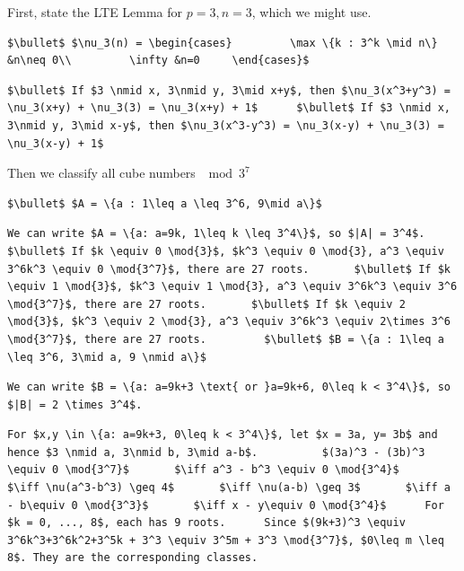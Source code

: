 \begin{enumerate}
First, state the LTE Lemma for $p = 3, n = 3$, which we might use.

 


 \begin{verbatim}
$\bullet$ $\nu_3(n) = \begin{cases}         \max \{k : 3^k \mid n\} &n\neq 0\\         \infty &n=0     \end{cases}$
\end{verbatim}

\begin{verbatim}
$\bullet$ If $3 \nmid x, 3\nmid y, 3\mid x+y$, then $\nu_3(x^3+y^3) = \nu_3(x+y) + \nu_3(3) = \nu_3(x+y) + 1$      $\bullet$ If $3 \nmid x, 3\nmid y, 3\mid x-y$, then $\nu_3(x^3-y^3) = \nu_3(x-y) + \nu_3(3) = \nu_3(x-y) + 1$   
\end{verbatim}

Then we classify all cube numbers $\mod{3^7}$
\begin{verbatim}
$\bullet$ $A = \{a : 1\leq a \leq 3^6, 9\mid a\}$
\end{verbatim}

\begin{verbatim}
We can write $A = \{a: a=9k, 1\leq k \leq 3^4\}$, so $|A| = 3^4$.          $\bullet$ If $k \equiv 0 \mod{3}$, $k^3 \equiv 0 \mod{3}, a^3 \equiv 3^6k^3 \equiv 0 \mod{3^7}$, there are 27 roots.       $\bullet$ If $k \equiv 1 \mod{3}$, $k^3 \equiv 1 \mod{3}, a^3 \equiv 3^6k^3 \equiv 3^6 \mod{3^7}$, there are 27 roots.       $\bullet$ If $k \equiv 2 \mod{3}$, $k^3 \equiv 2 \mod{3}, a^3 \equiv 3^6k^3 \equiv 2\times 3^6 \mod{3^7}$, there are 27 roots.         $\bullet$ $B = \{a : 1\leq a \leq 3^6, 3\mid a, 9 \nmid a\}$
\end{verbatim}

\begin{verbatim}
We can write $B = \{a: a=9k+3 \text{ or }a=9k+6, 0\leq k < 3^4\}$, so $|B| = 2 \times 3^4$. 
\end{verbatim}

\begin{verbatim}
For $x,y \in \{a: a=9k+3, 0\leq k < 3^4\}$, let $x = 3a, y= 3b$ and hence $3 \nmid a, 3\nmid b, 3\mid a-b$.          $(3a)^3 - (3b)^3 \equiv 0 \mod{3^7}$       $\iff a^3 - b^3 \equiv 0 \mod{3^4}$       $\iff \nu(a^3-b^3) \geq 4$       $\iff \nu(a-b) \geq 3$       $\iff a - b\equiv 0 \mod{3^3}$       $\iff x - y\equiv 0 \mod{3^4}$      For $k = 0, ..., 8$, each has 9 roots.      Since $(9k+3)^3 \equiv 3^6k^3+3^6k^2+3^5k + 3^3 \equiv 3^5m + 3^3 \mod{3^7}$, $0\leq m \leq 8$. They are the corresponding classes.
\end{verbatim}


\end{enumerate}
